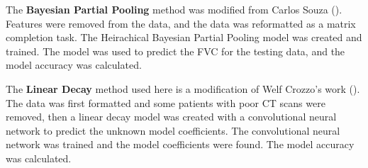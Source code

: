 \documentclass[12pt]{article}
\begin{document}

The \textbf{Bayesian Partial Pooling} method was modified from Carlos Souza (\cite{bayesian}). 
Features were removed from the data, and the data was reformatted as a matrix completion task.
The Heirachical Bayesian Partial Pooling model was created and trained.
The model was used to predict the FVC for the testing data, and the model accuracy was calculated.





The \textbf{Linear Decay} method used here is a modification of Welf Crozzo's work (\cite{lineardecay}).
The data was first formatted and some patients with poor CT scans were removed, then a linear decay model was created with a convolutional neural network to predict the unknown model coefficients.
The convolutional neural network was trained and the model coefficients were found.
The model accuracy was calculated.
\end{document}
